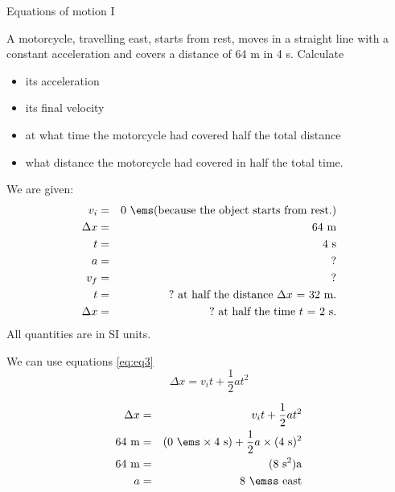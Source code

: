       \noindent
\begin{wex}{Equations of motion I}{A motorcycle, travelling east, starts from rest, moves in a straight line with a constant acceleration and covers a distance of 64 m in 4 s. Calculate
\begin{itemize}
\item its acceleration
\item its final velocity
\item at what time the motorcycle had covered half the total distance
\item what distance the motorcycle had covered in half the total time.
\end{itemize}}
{
We are given:
\begin{eqnarray*}
v_i&=&0\ \ems \mbox{(because the object starts from rest.)}\\
\Delta x&=&64\ \text{m}\\
t&=&4\ \text{s}\\
a&=&?\\
v_f&=&?\\
t&=&?\ \mbox{at half the distance $\Delta x$~=~32~m.}\\
\Delta x&=&?\ \mbox{at half the time $t$~=~2~s.}
\end{eqnarray*}
All quantities are in SI units.

We can use equations \ref{eq:eq3}
\begin{displaymath}
\Delta x = v_it +\frac{1}{2}at^2
\end{displaymath}

\begin{eqnarray*}
\Delta x &=& v_it +\frac{1}{2}at^2\\
64\ \text{m} &=& (0\ \ems \times 4\ \text{s}) + \frac{1}{2} a \times (4\ \text{s})^2\\
64\ \text{m} &=& (8\ \text{s}^2) \text{a}\\
a &=&8\ \emss~\text{east}
\end{eqnarray*}

}
\end{wex}
